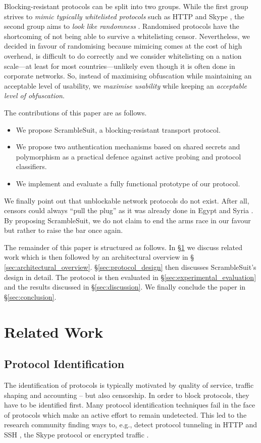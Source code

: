 \documentclass{sig-alternate}
\newcommand{\pt}{\textsf{ScrambleSuit}}
\numberwithin{enumi}{section}
\numberwithin{notesctr}{section}
\begin{document}
Blocking-resistant protocols can be split into two groups. While the first group strives to
\emph{mimic typically whitelisted protocols} such as HTTP \cite{Weinberg2012} and Skype
\cite{Moghaddam2012}, the second group aims to \emph{look like randomness}
\cite{obfs2,obfs3,Wiley2011}. Randomised protocols have the shortcoming of not being able to survive
a whitelisting censor. Nevertheless, we decided in favour of randomising because mimicing comes at
the cost of high overhead, is difficult to do correctly \cite{Houmansadr2013b} and we consider
whitelisting on a nation scale---at least for most countries---unlikely even though it is often
done in corporate networks. So, instead of maximising obfuscation while maintaining an acceptable
level of usability, we \emph{maximise usability} while keeping an \emph{acceptable level of
obfuscation}.

The contributions of this paper are as follows.
\begin{itemize}
	\item We propose \pt{}, a blocking-resistant transport protocol.
	\item We propose two authentication mechanisms based on shared secrets and polymorphism as a
		practical defence against active probing and protocol classifiers.
	\item We implement and evaluate a fully functional prototype of our protocol.
\end{itemize}

We finally point out that unblockable network protocols do not exist. After all, censors could
always ``pull the plug'' as it was already done in Egypt \cite{Dainotti2011} and Syria
\cite{SyriaOffline}. By proposing \pt{}, we do not claim to end the arms race in our favour but
rather to raise the bar once again.

The remainder of this paper is structured as follows. In \S \ref{sec:related_work} we discuss
related work which is then followed by an architectural overview in \S
\ref{sec:architectural_overview}. \S \ref{sec:protocol_design} then discusses \pt{}'s design in
detail. The protocol is then evaluated in \S \ref{sec:experimental_evaluation} and the results
discussed in \S \ref{sec:discussion}. We finally conclude the paper in \S \ref{sec:conclusion}.

\section{Related Work}
\label{sec:related_work}
\subsection{Protocol Identification} The identification of protocols is typically motivated by quality
of service, traffic shaping and accounting -- but also censorship. In order to block protocols, they
have to be identified first. Many protocol identification techniques fail in the face of protocols
which make an active effort to remain undetected. This led to the research community finding ways
to, e.g., detect protocol tunneling in HTTP and SSH \cite{Dusi2009}, the Skype protocol
\cite{Bonfiglio2007} or encrypted traffic \cite{BarYanai2010}.
\end{document}
